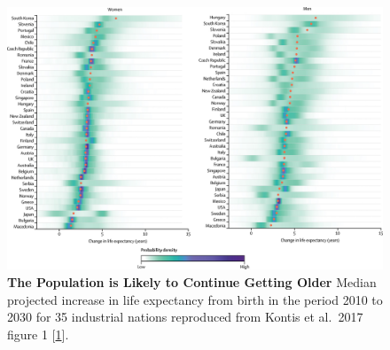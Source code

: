 \documentclass[
]{book}
\begin{document}
\begin{figure}

{\centering \includegraphics[width=0.95\linewidth]{figs/Kontis2017_fig1} 

}

\caption{\textbf{The Population is Likely to Continue Getting Older} Median projected increase in life expectancy from birth in the period 2010 to 2030 for 35 industrial nations reproduced from Kontis et al.~2017 figure 1 {[}\protect\hyperlink{ref-Kontis2017}{1}{]}.}\label{fig:Kontis2017-fig1}
\end{figure}
\end{document}
